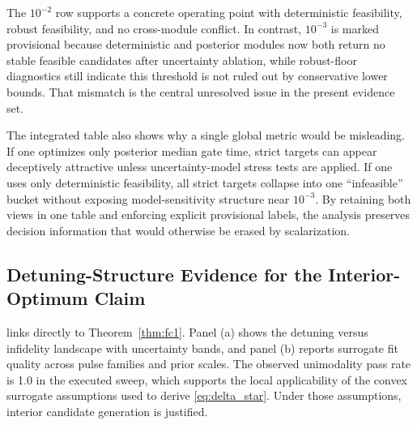 \documentclass{article} %
\begin{document}
\begin{table}[t]
\caption{Integrated thresholded tradeoff summary across deterministic, robust-floor, and posterior analyses. The table reports speed, error, feasibility-rate, and consistency diagnostics at each requested target. Provisional flags indicate unresolved methodological disagreement rather than numerical instability in a single module.}
\label{tab:integrated}
\centering
\small
\renewcommand{\arraystretch}{1.1}
\setlength{\tabcolsep}{4pt}
\end{table}

The $10^{-2}$ row supports a concrete operating point with deterministic feasibility, robust feasibility, and no cross-module conflict. In contrast, $10^{-3}$ is marked provisional because deterministic and posterior modules now both return no stable feasible candidates after uncertainty ablation, while robust-floor diagnostics still indicate this threshold is not ruled out by conservative lower bounds. That mismatch is the central unresolved issue in the present evidence set.

The integrated table also shows why a single global metric would be misleading. If one optimizes only posterior median gate time, strict targets can appear deceptively attractive unless uncertainty-model stress tests are applied. If one uses only deterministic feasibility, all strict targets collapse into one ``infeasible'' bucket without exposing model-sensitivity structure near $10^{-3}$. By retaining both views in one table and enforcing explicit provisional labels, the analysis preserves decision information that would otherwise be erased by scalarization.

\subsection{Detuning-Structure Evidence for the Interior-Optimum Claim}
 links directly to Theorem~\ref{thm:fc1}. Panel (a) shows the detuning versus infidelity landscape with uncertainty bands, and panel (b) reports surrogate fit quality across pulse families and prior scales. The observed unimodality pass rate is 1.0 in the executed sweep, which supports the local applicability of the convex surrogate assumptions used to derive \eqref{eq:delta_star}. Under those assumptions, interior candidate generation is justified.
\end{document}
